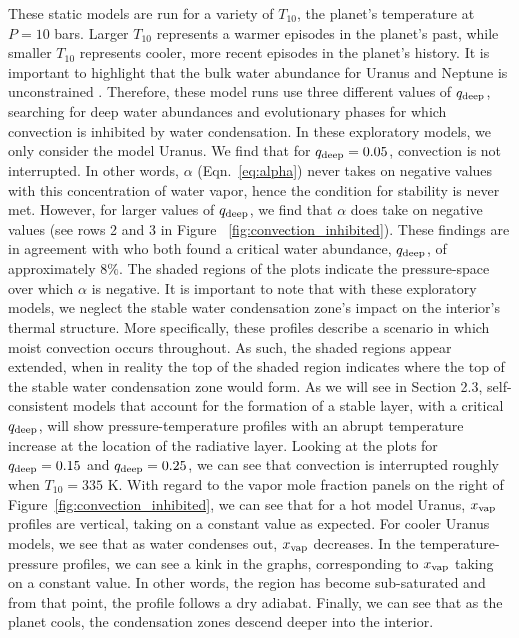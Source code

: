 \documentclass[11pt]{ucscthesisbs}
\begin{document}
These static models are run for a variety of $T_{10}$, the planet's temperature at $P=10$ bars. Larger $T_{10}$ represents a warmer episodes in the planet's past, while smaller $T_{10}$ represents cooler, more recent episodes in the planet's history.  It is important to highlight that the bulk water abundance for Uranus and Neptune is unconstrained \citep{guillot_1995}. Therefore, these model runs use three different values of $q_{\rm deep}$, searching for deep water abundances and evolutionary phases for which convection is inhibited by water condensation. In these exploratory models, we only consider the model Uranus. We find that for $q_{\rm deep} = 0.05$, convection is not interrupted. In other words, $\alpha$ (Eqn.~\ref{eq:alpha})  never takes on negative values with this concentration of water vapor, hence the condition for stability is never met. However, for larger values of $q_{\rm deep}$, we find that $\alpha$ does take{} on negative values (see rows 2 and 3 in Figure ~\ref{fig:convection_inhibited}). These findings are in agreement with \citep{friedson_2017,leconte_2017} who both found a critical water abundance, $q_{\rm deep}$, of approximately $8\%$. The shaded regions of the plots indicate the pressure-space over which $\alpha$ is negative. It is important to note that with these exploratory models, we neglect the stable water condensation zone's impact on the interior's thermal structure. More specifically, these profiles describe a scenario in which moist convection occurs throughout. As such, the shaded regions appear extended, when in reality the top of the shaded region indicates where the top of the stable water condensation zone would form. As we will see in Section 2.3, self-consistent models that account for the formation of a stable layer, with a critical $q_{\rm deep}$, will show pressure-temperature profiles with an abrupt temperature increase at the location of the radiative layer. Looking at the plots for $q_{\rm deep} = 0.15$ and $q_{\rm deep} = 0.25$, we can see that convection is interrupted roughly when $T_{10} = 335$ K. With regard to the vapor mole fraction panels on the right of Figure~\ref{fig:convection_inhibited}, we can see that for a hot model Uranus, $x_{\rm vap}$ profiles are vertical, taking on a constant value as expected. For cooler Uranus models, we see that as water condenses out, $x_{\rm vap}$ decreases. In the temperature-pressure profiles, we can see a kink in the graphs, corresponding to $x_{\rm vap}$ taking on a constant value. In other words, the region has become sub-saturated and from that point, the profile follows a dry adiabat. Finally, we can see that as the planet cools, the condensation zones descend deeper into the interior.
\end{document}
